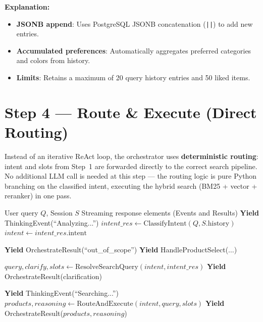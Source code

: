 \textbf{Explanation:}
\begin{itemize}
    \item \textbf{JSONB append}: Uses PostgreSQL JSONB concatenation (\texttt{||}) to add new entries.
    \item \textbf{Accumulated preferences}: Automatically aggregates preferred categories and colors from history.
    \item \textbf{Limits}: Retains a maximum of 20 query history entries and 50 liked items.
\end{itemize}

\section{Step 4 --- Route \& Execute (Direct Routing)}

\begin{tcolorbox}[title=Method: Deterministic Direct Routing (0 LLM calls)]
Instead of an iterative ReAct loop, the orchestrator uses \textbf{deterministic routing}: intent and slots from Step~1 are forwarded directly to the correct search pipeline. No additional LLM call is needed at this step --- the routing logic is pure Python branching on the classified intent, executing the hybrid search (BM25 + vector + reranker) in one pass.
\end{tcolorbox}

\begin{algorithm}[H]
\caption{Direct Routing Orchestration}\label{alg:routing}
\begin{algorithmic}[1]
\Require User query $Q$, Session $S$
\Ensure Streaming response elements (Events and Results)
    \State \textbf{Yield} ThinkingEvent(``Analyzing...'')
    \State $intent\_res \gets \text{ClassifyIntent}(Q, S.\text{history})$
    \State $intent \gets intent\_res.\text{intent}$
    
        \State \textbf{Yield} OrchestrateResult(``out\_of\_scope'')
        \State \Return
        \State \textbf{Yield} HandleProductSelect($\dots$)
        \State \Return
    \EndIf
    
    \State $query, clarify, slots \gets \text{ResolveSearchQuery}(intent, intent\_res)$
        \State \textbf{Yield} OrchestrateResult(clarification)
        \State \Return
    \EndIf
    
    \State \textbf{Yield} ThinkingEvent(``Searching...'')
    \State $products, reasoning \gets \text{RouteAndExecute}(intent, query, slots)$
    \State \textbf{Yield} OrchestrateResult($products, reasoning$)
\EndProcedure
\end{algorithmic}
\end{algorithm}

